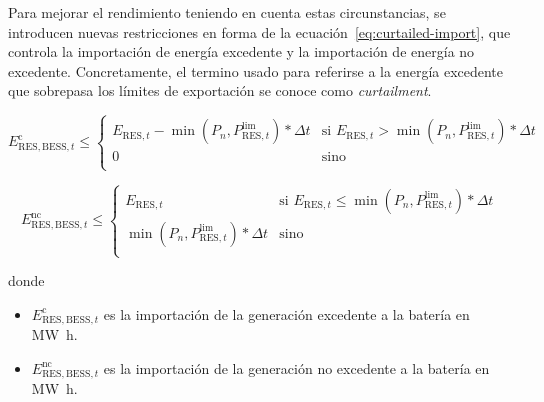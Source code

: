 Para mejorar el rendimiento teniendo en cuenta estas circunstancias, se introducen nuevas restricciones en forma de la ecuación~\ref{eq:curtailed-import}, que controla la importación de energía excedente y la importación de energía no excedente. Concretamente, el termino usado para referirse a la energía excedente que sobrepasa los límites de exportación se conoce como \textit{curtailment}.

\begin{samepage}%
  \label{eq:curtailed-import}

  \begin{equation}%
    E^{\text{c}}_{\text{RES}, \text{BESS}, t} \le
    \begin{cases}
      E_{\text{RES}, t} - \min(P_{n}, P^{\text{lim}}_{\text{RES}, t}) * \Delta t & \text{si } E_{\text{RES}, t} > \min(P_{n}, P^{\text{lim}}_{\text{RES}, t}) * \Delta t \\
      0                                                                          & \text{sino}                                                                           \\
    \end{cases}
  \end{equation}

  \begin{equation}%
    E^{\text{nc}}_{\text{RES}, \text{BESS}, t} \le
    \begin{cases}
      E_{\text{RES}, t}                                      & \text{si } E_{\text{RES}, t} \le \min(P_{n}, P^{\text{lim}}_{\text{RES}, t}) * \Delta t \\
      \min(P_{n}, P^{\text{lim}}_{\text{RES}, t}) * \Delta t & \text{sino}                                                                             \\
    \end{cases}
  \end{equation}

  donde

  \begin{itemize}

    \item \( E^{\text{c}}_{\text{RES}, \text{BESS}, t} \) es la importación de la generación excedente a la batería en \si{{\mega\watt\hour}}.

    \item \( E^{\text{nc}}_{\text{RES}, \text{BESS}, t} \) es la importación de la generación no excedente a la batería en \si{{\mega\watt\hour}}.

  \end{itemize}

\end{samepage}


